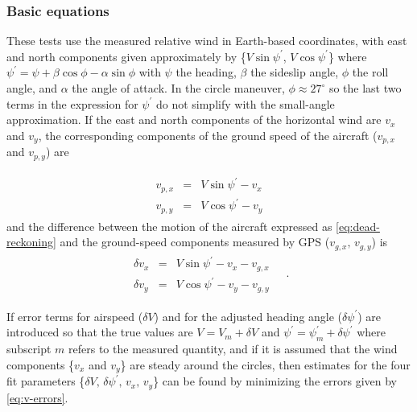 \documentclass[12pt,twoside,english]{article}\usepackage[]{graphicx}\usepackage[]{color}
\let\OrgIndex\index
\renewcommand*{\index}[1]{\OrgIndex{#1}}
\begin{document}
{{\subsubsection{Basic equations}

These tests use the measured relative wind in Earth-based coordinates, with east and north components given approximately by \{$V\sin\psi^{\prime}$, $V\cos\psi^{\prime}$\} where $\psi^{\prime}=\psi+\beta\cos\phi-\alpha\sin\phi$ with $\psi$ the heading, $\beta$ the sideslip angle, $\phi$ the roll angle, and $\alpha$ the angle of attack. In the circle maneuver, $\phi\approx27^{\circ}$ so the last two terms in the expression for $\psi^{\prime}$ do not simplify with the small-angle approximation. If the east and north components of the horizontal wind are $v_{x}$ and $v_{y}$, the corresponding components of the ground speed of the aircraft ($v_{p,x}$ and $v_{p,y}$) are 

\begin{eqnarray}
\begin{split}
v_{p,x} & = & V\sin\psi^{\prime}-v_{x}\\ v_{p,y} & = & V\cos\psi^{\prime}-v_{y} 
\end{split}
\label{eq:dead-reckoning}
\end{eqnarray}
and the difference between the motion of the aircraft expressed as \eqref{eq:dead-reckoning} and the ground-speed components measured by GPS ($v_{g,x},\,v_{g,y}$) is\\ 
\begin{eqnarray}
\begin{split}
\delta v_{x} & = & V\sin\psi^{\prime}-v_{x}-v_{g,x}\\ 
\delta v_{y} & = & V\cos\psi^{\prime}-v_{y}-v_{g,y} 
\end{split}
~~~~~.\label{eq:v-errors} 
\end{eqnarray}

If error terms for airspeed ($\delta V$) and for the adjusted heading angle ($\delta\psi^{\prime}$) are introduced so that the true values are $V=V_{m}+\delta V$ and $\psi^{\prime}=\psi_{m}^{\prime}+\delta\psi^{\prime}$ where subscript $m$ refers to the measured quantity, and if it is assumed that the wind components \{$v_{x}$ and $v_{y}$\} are steady around the circles, then estimates for the four fit parameters \{$\delta V,\,\delta\psi^{\prime},\,v_{x},\,v_{y}$\} can be found by minimizing the errors given by \eqref{eq:v-errors}. 

}}
\end{document}
